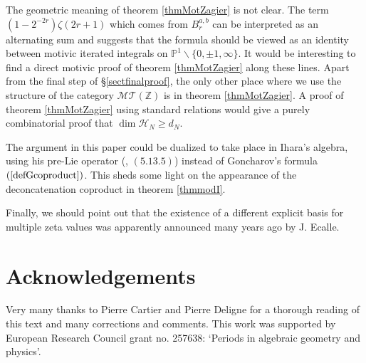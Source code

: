 \documentclass[10pt]{amsart}
\theoremstyle{definition}
\theoremstyle{remark}
\numberwithin{equation}{section}
\newcommand{\Z}{\mathbb Z}
\newcommand{\Pro}{\mathbb P}
\newcommand{\Ho}{\mathcal{H}}
\newcommand{\MT}{\mathcal{MT}}
\begin{document}
The geometric meaning of theorem \ref{thmMotZagier} is not  clear.   The term $(1-2^{-2r}) \zeta(2r+1)$ which comes from  $B^{a,b}_r$  
can  be interpreted  as an alternating sum  and suggests that the formula should be viewed   as an identity between motivic iterated integrals on $\Pro^1\backslash \{0,\pm 1,\infty\}$.  It would be interesting to find a direct motivic proof of theorem \ref{thmMotZagier}  along these lines. Apart from the final step of \S\ref{sectfinalproof}, 
the only other place where we use the structure of the category $\MT(\Z)$ is in  theorem \ref{thmMotZagier}. A proof of theorem  \ref{thmMotZagier} using standard relations would
give a purely combinatorial proof that $\dim \Ho_N \geq d_N$.

The  argument in this paper could  be dualized to take place in Ihara's  algebra, using his pre-Lie  operator  (\cite{DG}, $(5.13.5)$) instead of Goncharov's formula  $(\ref{defGcoproduct})$. This  sheds some light on  the appearance of the deconcatenation coproduct in theorem \ref{thmmodI}.

Finally, we should point out that the existence of a different explicit basis for multiple zeta values was  apparently announced many years ago by J.   Ecalle.



\section{Acknowledgements}
Very many thanks to Pierre Cartier and Pierre Deligne for a thorough reading of this text and many  corrections and comments.  
 This work was  supported by  European Research Council grant no.  257638: `Periods in algebraic geometry and physics'. 



\end{document}
